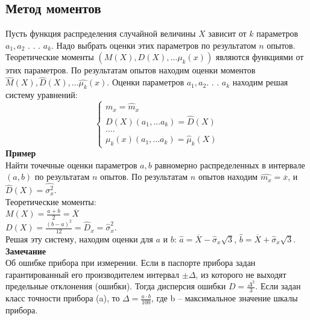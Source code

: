 \documentclass[russian, 12pt, fleqn]{article}
\begin{document}
\subsection{Метод моментов}
\noindent
Пусть функция распределения случайной величины $X$ зависит от $k$ параметров $a_1, a_2$ . . . $a_k$. Надо выбрать оценки этих параметров по результатом $n$ опытов. Теоретические моменты $(M(X), D(X), ... \mu_k(x))$ являются функциями от этих параметров. По результатам опытов находим оценки моментов  $\hat{M}(X),\hat{D}(X), ... \hat{\mu_k}(x)$.
Оценки параметров $a_1, a_2$. . . $a_k$ находим решая систему уравнений:\\
\begin{equation*} 
 \begin{cases}
  m_x = \hat{m}_x\\
  D(X) (a_1, ... a_k) = \hat{D}(X)\\
  ....\\
 \mu_k(x) (a_1, ... a_k) = \hat{\mu}_k(X)
 \end{cases}
\end{equation*}
\textbf{Пример}\\
Найти точечные оценки параметров $a, b$ равномерно распределенных в интервале $(a, b)$ по результатам $n$ опытов. По результатам $n$ опытов находим $\hat{m_x} = \overline{x}$, и $\hat{D}(X) = \hat{\sigma_x^2}$.\\
Теоретические моменты:\\
$M(X) = \frac{a + b}{2} = \overline{X}$\\
$D(X) = \frac{(b-a)^2}{12} = \hat{D}_x = \hat{\sigma}_x^2$.\\
Решая эту систему, находим оценки для $a$ и $b$: $\hat{a} = \overline{X} - \hat{\sigma}_{x} \sqrt{3}$,  $\hat{b} = \overline{X} + \hat{\sigma}_x \sqrt{3}$.\\
\textbf{Замечание\ } \\
Об ошибке прибора при  измерении. Если в паспорте прибора задан гарантированный его производителем интервал $\pm \Delta$, из которого не выходят предельные отклонения (ошибки).  Тогда дисперсия ошибки $D = \frac{\Delta^2}{3}$. Если задан класс точности прибора (a), то $\Delta = \frac{a \cdot b}{100}$, где b -- максимальное значение шкалы прибора.\\
\end{document}

